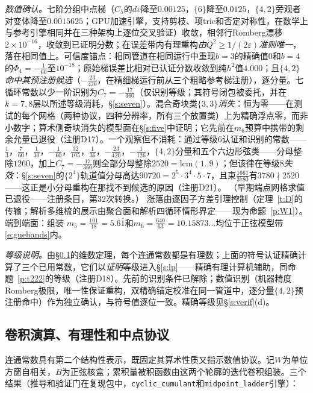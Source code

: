 \documentclass[11pt]{article}
\numberwithin{equation}{section}
\theoremstyle{definition}
\theoremstyle{remark}
\begin{document}
\emph{数值确认。}七阶分组中点梯（$C_5$的$dv$降至$0.00125$，$\{6\}$降至$0.0125$，$\{4,2\}$旁观者对变体降至$0.0015625$；GPU加速引擎，支持剪枝、项trie和否定对称性，在数学上与参考引擎相同并在三种架构上逐位交叉验证）收敛，相邻行Romberg漂移$2\times10^{-16}$，收敛到已证明分数；在误差带内有理重构\emph{由$Q^{2}\ge1/(2\varepsilon)$准则唯一}，落在相同值上。可信度锚点：相同管道在相同运行中重现$b=3$的精确值$0$和$b=4$的$\Phi_4=-\tfrac1{60}$至$10^{-18}$；原始梯误差比相对已认证分数收敛到纯$h^{2}$值$4.000$；且$\{4,2\}$\emph{命中其预注册候选}（$-\tfrac{23}{420}$，在精细梯运行前从三个粗略参考梯注册），逐分量。七循环常数以少一阶识别为$C_7=-\tfrac{17}{360}$（仅识别等级；其符号闭包被委托，并在$k=7,8$层以所述等级消耗，\S\ref{s:seven}）。混合奇块类$\{3,3\}$\emph{消失}：恒为零——在测试的每个网格（两种协议，四种分辨率，所有三个放置类）上为精确浮点零，而非小数字；算术侧奇块消失的模型面在\S\ref{s:five}中证明；它先前在$m_6$预算中携带的剩余允量已退役（注册D17）。一个观察但不消耗：通过等级$6$认证和识别的常数——$\tfrac13$，$\tfrac7{60}$，$\tfrac1{30}$，$-\tfrac1{60}$，$\tfrac{32}{105}$，$\tfrac1{36}$，$-\tfrac{23}{420}$，$-\tfrac1{126}$，$\{4,2\}$分量和五个六边形弦类——分母整除$1260$，加上$C_7=-\tfrac{17}{360}$则全部分母整除$2520=\mathrm{lcm}(1..9)$；但该律在等级$8$\emph{失效}：\S\ref{s:seven}的$\{2^4\}$轨道值分母高达$90720=2^5\cdot3^4\cdot5\cdot7$，且束$\tfrac{1661}{3780}$有$3780\nmid2520$——这正是小分母重构在那找不到候选的原因（注册D21）。
（早期端点网格求值已退役——注册条目，第32次转换。）
涨落由逐因子方差引理控制（定理~\ref{t:D}的传输；解析多维梳的展示由聚合面和解析四循环情形界定——现为命题~\ref{p:W1}）。端到端面：组装
$m_5=\tfrac{101}{18}=5.6\overline{1}$和$m_6=\tfrac{640}{63}=10.15873\ldots$均位于正弦模型带\eqref{e:guebands}内。

\emph{等级说明。}由\S\ref{s:conv}的维数定理，每个连通常数都是有理数；上面的符号认证精确计算了三个已用常数，它们以\emph{证明}等级进入\S\ref{s:lp}——精确有理计算机辅助，同命题~\ref{p:t222}的等级（注册D18）。先前的识别条件已解除；数值识别（机器精度Romberg极限，唯一性保证重构，双精确锚定校准在同一管道中，逐分量$\{4,2\}$预注册命中）作为独立确认，与符号值逐位一致。精确等级见\S\ref{s:verif}(d)。

\subsection{卷积演算、有理性和中点协议}\label{s:conv}

连通常数具有第二个结构性表示，既固定其算术性质又指示数值协议。记$W$为单位方窗自相关，$B$为正弦核盒；累积量被积函数由这两个轮廓的迭代卷积组装。三个结果（推导和验证门在复现包中，\texttt{cyclic\_cumulant}和\texttt{midpoint\_ladder}引擎）：
\end{document}
